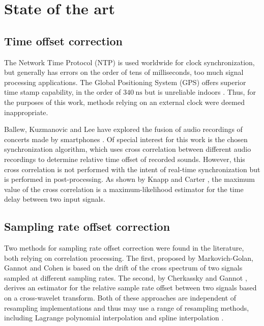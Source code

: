 \documentclass[a4paper, notitlepage]{report}
\begin{document}
\section{State of the art}
\subsection{Time offset correction} 
\label{sec:to_correction_state_of_art}
The Network Time Protocol (NTP) is used worldwide for clock synchronization, but generally has errors on the order of tens of milliseconds, too much signal processing applications. The Global Positioning System (GPS) offers superior time stamp capability, in the order of $340~\mathrm{ns}$ but is unreliable indoors \cite{wehr2004}. Thus, for the purposes of this work, methods relying on an external clock were deemed inappropriate.

Ballew, Kuzmanovic and Lee have explored the fusion of audio recordings of concerts made by smartphones \cite{ballew2011}. Of special interest for this work is the chosen synchronization algorithm, which uses cross correlation between different audio recordings to determine relative time offset of recorded sounds. However, this cross correlation is not performed with the intent of real-time synchronization but is performed in post-processing. As shown by Knapp and Carter \cite{Knapp1976}, the maximum value of the cross correlation is a maximum-likelihood estimator for the time delay between two input signals.

\subsection{Sampling rate offset correction}
Two methods for sampling rate offset correction were found in the literature, both relying on correlation processing. The first, proposed by Markovich-Golan, Gannot and Cohen \cite{golan2012} is based on the drift of the cross spectrum of two signals sampled at different sampling rates. The second, by Cherkassky and Gannot \cite{cherkassky2014}, derives an estimator for the relative sample rate offset between two signals based on a cross-wavelet transform. Both of these approaches are independent of resampling implementations and thus may use a range of resampling methods, including Lagrange polynomial interpolation \cite{pawig2010, golan2012} and spline interpolation \cite{cherkassky2014}.
\end{document}
